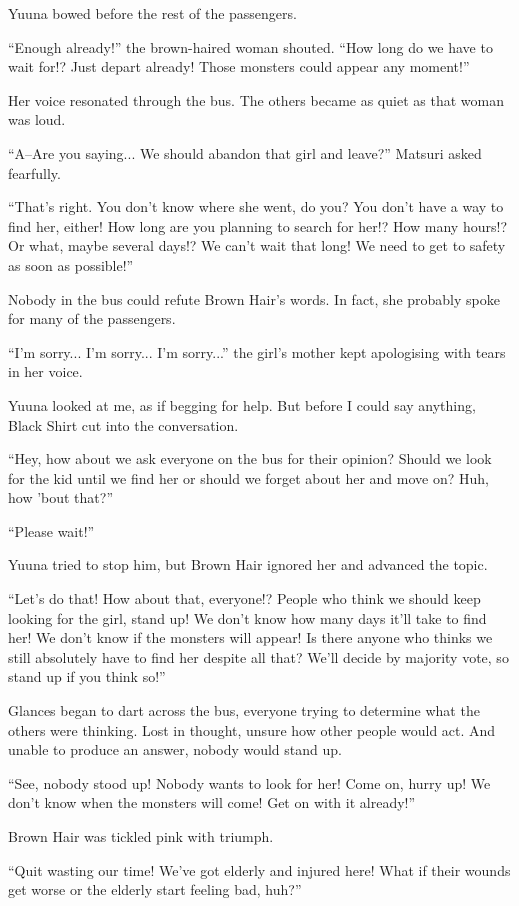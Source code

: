 Yuuna bowed before the rest of the passengers.

``Enough already!'' the brown-haired woman shouted.  ``How long do we have to wait for!? Just depart already! Those monsters could appear any moment!''

Her voice resonated through the bus. The others became as quiet as that woman was loud.

``A--Are you saying... We should abandon that girl and leave?'' Matsuri asked fearfully.

``That's right. You don't know where she went, do you? You don't have a way to find her, either! How long are you planning to search for her!? How many hours!? Or what, maybe several days!? We can't wait that long! We need to get to safety as soon as possible!''

Nobody in the bus could refute Brown Hair's words. In fact, she probably spoke for many of the passengers.

``I'm sorry... I'm sorry... I'm sorry...'' the girl's mother kept apologising with tears in her voice.

Yuuna looked at me, as if begging for help. But before I could say anything, Black Shirt cut into the conversation.

``Hey, how about we ask everyone on the bus for their opinion? Should we look for the kid until we find her or should we forget about her and move on? Huh, how 'bout that?''

``Please wait!''

Yuuna tried to stop him, but Brown Hair ignored her and advanced the topic.

``Let's do that! How about that, everyone!? People who think we should keep looking for the girl, stand up! We don't know how many days it'll take to find her! We don't know if the monsters will appear! Is there anyone who thinks we still absolutely have to find her despite all that? We'll decide by majority vote, so stand up if you think so!''

Glances began to dart across the bus, everyone trying to determine what the others were thinking. Lost in thought, unsure how other people would act. And unable to produce an answer, nobody would stand up.

``See, nobody stood up! Nobody wants to look for her! Come on, hurry up! We don't know when the monsters will come! Get on with it already!''

Brown Hair was tickled pink with triumph.

``Quit wasting our time! We've got elderly and injured here! What if their wounds get worse or the elderly start feeling bad, huh?''

